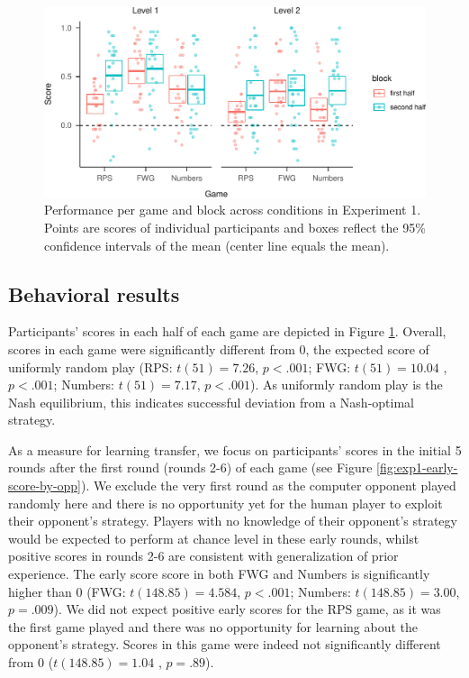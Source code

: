 \documentclass[smallextended]{svjour3}       %
\begin{document}
\begin{figure}

{\centering \includegraphics[width=\textwidth]{CBB_v2_files/figure-latex/exp1-avg-scores-game-1} 

}

\caption{Performance per game and block across conditions in Experiment 1. Points are scores of individual participants and boxes reflect the 95\% confidence intervals of the mean (center line equals the mean).}\label{fig:exp1-avg-scores-game}
\end{figure}

\hypertarget{behavioral-results}{%
\subsection{Behavioral results}\label{behavioral-results}}

Participants' scores in each half of each game are depicted in Figure
\ref{fig:exp1-avg-scores-game}. Overall, scores in each game were
significantly different from 0, the expected score of uniformly random
play (RPS: \(t(51) = 7.26\), \(p < .001\); FWG: \(t(51) = 10.04\) ,
\(p < .001\); Numbers: \(t(51) = 7.17\), \(p < .001\)). As uniformly
random play is the Nash equilibrium, this indicates successful deviation
from a Nash-optimal strategy.

As a measure for learning transfer, we focus on participants' scores in
the initial 5 rounds after the first round (rounds 2-6) of each game
(see Figure \ref{fig:exp1-early-score-by-opp}). We exclude the very
first round as the computer opponent played randomly here and there is
no opportunity yet for the human player to exploit their opponent's
strategy. Players with no knowledge of their opponent's strategy would
be expected to perform at chance level in these early rounds, whilst
positive scores in rounds 2-6 are consistent with generalization of
prior experience. The early score score in both FWG and Numbers is
significantly higher than 0 (FWG: \(t(148.85) = 4.584\), \(p < .001\);
Numbers: \(t(148.85) = 3.00\), \(p = .009\)). We did not expect positive
early scores for the RPS game, as it was the first game played and there
was no opportunity for learning about the opponent's strategy. Scores in
this game were indeed not significantly different from 0
(\(t(148.85) = 1.04\) , \(p = .89\)).
\end{document}
